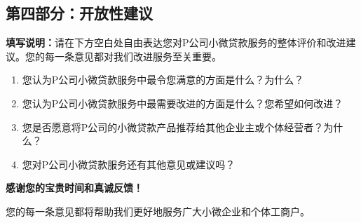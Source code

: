 \newpage

\subsection*{第四部分：开放性建议}

\textbf{填写说明：}请在下方空白处自由表达您对P公司小微贷款服务的整体评价和改进建议。您的每一条意见都对我们改进服务至关重要。

\vspace{1em}
\begin{enumerate}[label=1.,leftmargin=2em]
  \item 您认为P公司小微贷款服务中最令您满意的方面是什么？为什么？

  \vspace{2.5cm}

  \item 您认为P公司小微贷款服务中最需要改进的方面是什么？您希望如何改进？

  \vspace{2.5cm}

  \item 您是否愿意将P公司的小微贷款产品推荐给其他企业主或个体经营者？为什么？

  \vspace{2.5cm}

  \item 您对P公司小微贷款服务还有其他意见或建议吗？

  \vspace{2.5cm}
\end{enumerate}

\vspace{1em}
\begin{center}
\textbf{感谢您的宝贵时间和真诚反馈！}

\vspace{0.5em}
您的每一条意见都将帮助我们更好地服务广大小微企业和个体工商户。
\end{center}

\endinput
